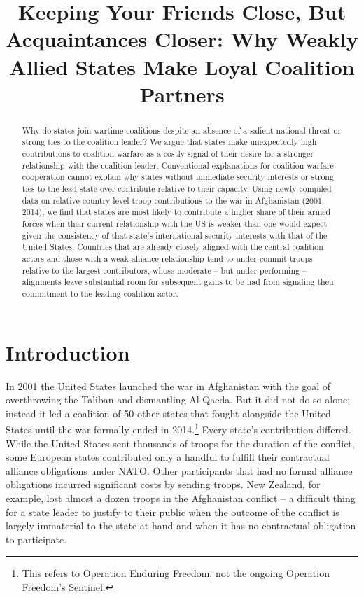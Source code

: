 \documentclass[12pt,letterpaper]{article}
\title{Keeping Your Friends Close, But Acquaintances Closer: Why Weakly Allied States Make Loyal Coalition Partners}
\begin{document}
	
\begin{singlespace}
\maketitle

\begin{abstract}
Why do states join wartime coalitions despite an absence of a salient national threat or strong ties to the coalition leader? We argue that states make unexpectedly high contributions to coalition warfare as a costly signal of their desire for a stronger relationship with the coalition leader. Conventional explanations for coalition warfare cooperation cannot explain why states without immediate security interests or strong ties to the lead state over-contribute relative to their capacity. Using newly compiled data on relative country-level troop contributions to the war in Afghanistan (2001-2014), we find that states are most likely to contribute a higher share of their armed forces when their current relationship with the US is weaker than one would expect given the consistency of that state's international security interests with that of the United States. Countries that are already closely aligned with the central coalition actors and those with a weak alliance relationship tend to under-commit troops relative to the largest contributors, whose moderate -- but under-performing -- alignments leave substantial room for subsequent gains to be had from signaling their commitment to the leading coalition actor.
\end{abstract}
\end{singlespace}

\section{Introduction}
	In 2001 the United States launched the war in Afghanistan with the goal of overthrowing the Taliban and dismantling Al-Qaeda. But it did not do so alone; instead it led a coalition of 50 other states that fought alongside the United States until the war formally ended in 2014.\footnote{This refers to Operation Enduring Freedom, not the ongoing Operation Freedom's Sentinel.} Every state's contribution differed. While the United States sent thousands of troops for the duration of the conflict, some European states contributed only a handful to fulfill their contractual alliance obligations under NATO. Other participants that had no formal alliance obligations incurred significant costs by sending troops. New Zealand, for example, lost almost a dozen troops in the Afghanistan conflict -- a difficult thing for a state leader to justify to their public when the outcome of the conflict is largely immaterial to the state at hand and when it has no contractual obligation to participate.
\end{document}
